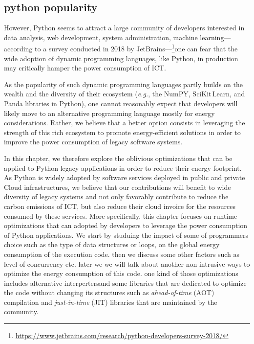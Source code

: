\subsection{python popularity}

However, Python seems to attract a large community of developers interested in data analysis, web development, system administration, machine learning---according to a survey conducted in 2018 by JetBrains---\footnote{\url{https://www.jetbrains.com/research/python-developers-survey-2018/}}one can fear that the wide adoption of dynamic programming languages, like Python, in production may critically hamper the power consumption of ICT.

As the popularity of such dynamic programming languages partly builds on the wealth and the diversity of their ecosystem (\emph{e.g.}, the NumPY, SciKit\,Learn, and Panda libraries in Python), one cannot reasonably expect that developers will likely move to an alternative programming language mostly for energy considerations.
Rather, we believe that a better option consists in leveraging the strength of this rich ecosystem to promote energy-efficient solutions in order to improve the power consumption of legacy software systems.


In this chapter, we therefore explore the oblivious optimizations that can be applied to Python legacy applications in order to reduce their energy footprint.
As Python is widely adopted by software services deployed in public and private Cloud infrastructures, we believe that our contributions will benefit to wide diversity of legacy systems and not only favorably contribute to reduce the carbon emissions of ICT, but also reduce their cloud invoice for the resources consumed by these services.
More specifically, this chapter focuses on runtime optimizations that can adopted by developers to leverage the power consumption of Python applications.
We start by studuing the impact of some of programmers choice such as the type of data structures or loops, on the global energy consumption of the execution code.
then we discuss some other factors such as level of concurrency etc. later we we will talk about another non intrusive ways to optimize the energy consumption of this code. one kind of those optimizations includes alternative interpertersand some libraries that are dedicated to optimize the code without changing its structures such as \emph{ahead-of-time} (AOT) compilation and \emph{just-in-time} (JIT) libraries that are maintained by the community.


